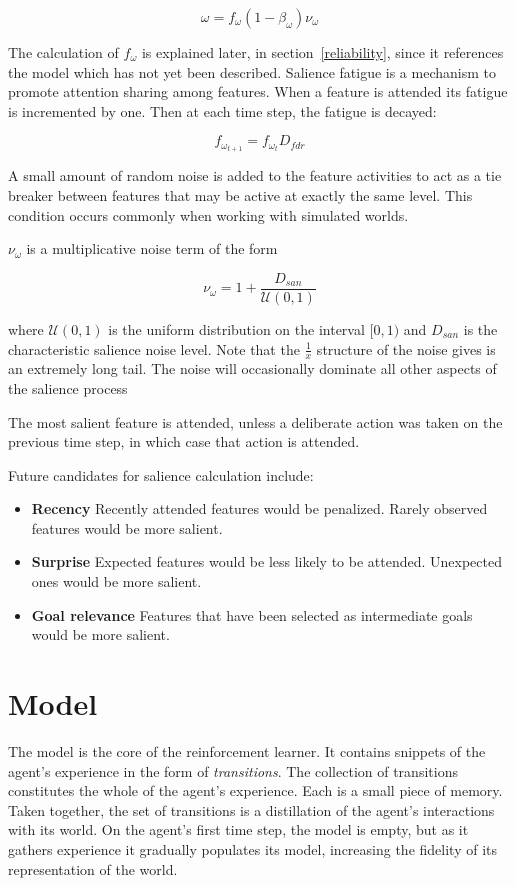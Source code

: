 \begin{equation}
\omega = f _\omega (1 - \beta_\omega) \nu_\omega
\end{equation}

The calculation of $f_\omega$ is explained later, in section~\ref{reliability}, since it references the model which has not yet been described. Salience fatigue is a mechanism to promote attention sharing among features. When a feature is attended its fatigue is incremented by one. Then at each time step, the fatigue is decayed:

\begin{equation}
f_{\omega_{t+1}} = f_{\omega_t}  D_{fdr}
\end{equation}

A small amount of random noise is added to the feature activities to act as a tie breaker between features that may be active at exactly the same level. This condition occurs commonly when working with simulated worlds. 

$\nu_\omega$ is a multiplicative noise term of the form

\begin{equation}
\nu_\omega= 1 + \frac{D_{san} }{ \mathcal{U}(0,1)}
\end{equation}

where $ \mathcal{U}(0,1)$ is the uniform distribution on the interval $[0,1)$ and $D_{san}$ is the characteristic salience noise level. Note that the $\frac{1}{x}$ structure of the noise gives is an extremely long tail. The noise will occasionally dominate all other aspects of the salience process

The most salient feature is attended, unless a deliberate action was taken on the previous time step, in which case that action is attended. 

Future candidates for salience calculation include:

\begin{itemize}
\item {\bf Recency}  Recently attended features would be penalized. Rarely observed features would be more salient.
\item {\bf Surprise} Expected features would be less likely to be attended. Unexpected ones would be more salient.
\item {\bf Goal relevance} Features that have been selected as intermediate goals would be more salient.
\end{itemize}


\section{Model}
The model is the core of the reinforcement learner. It contains snippets of the agent's experience in the form of {\em transitions}. The collection of transitions constitutes the whole of the agent's experience. Each is a small piece of memory. Taken together, the set of transitions is a distillation of the agent's interactions with its world. On the agent's first time step, the model is empty, but as it gathers experience it gradually populates its model, increasing the fidelity of its representation of the world. 

